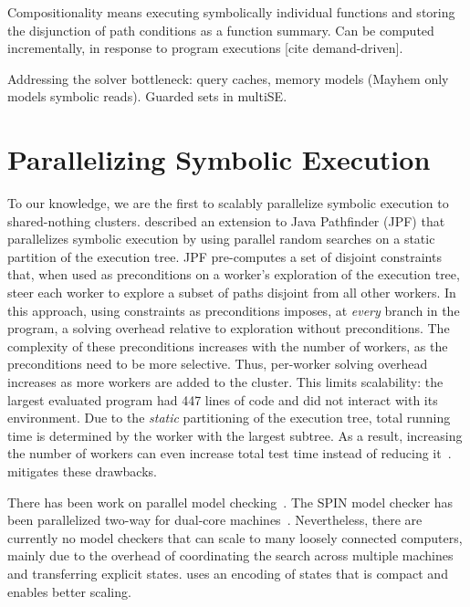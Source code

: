 Compositionality means executing symbolically individual functions and storing the disjunction of path conditions as a function summary.  Can be computed incrementally, in response to program executions [cite demand-driven].

Addressing the solver bottleneck: query caches, memory models (Mayhem only models symbolic reads). Guarded sets in multiSE.
\fi

\section{Parallelizing Symbolic Execution}
\label{sec:relwork:parsymbex}

To our knowledge, we are the first to scalably parallelize symbolic execution to shared-nothing clusters.
%
\cite{parallelSymbex} described an extension to Java Pathfinder (JPF) that parallelizes symbolic execution by using parallel random searches on a static partition of the execution tree.  JPF pre-computes a set of disjoint constraints that, when used as preconditions on a worker's exploration of the execution tree, steer each worker to explore a subset of paths disjoint from all other workers.  In this approach, using constraints as preconditions imposes, at {\em every} branch in the program, a solving overhead relative to exploration without preconditions.  The complexity of these preconditions increases with the number of workers, as the preconditions need to be more selective.  Thus, per-worker solving overhead increases as more workers are added to the cluster.  This limits scalability: the largest evaluated program had 447 lines of code and did not interact with its environment.  Due to the {\em static} partitioning of the execution tree, total running time is determined by the worker with the largest subtree.  As a result, increasing the number of workers can even increase total test time instead of reducing it~\cite{parallelSymbex}.  \cnine mitigates these drawbacks.

There has been work on parallel model checking~\cite{parallelMurphi,distributed-spin,loadBalModelchecking,spin:multicore-modelchecking,modelCheckBDD}.  The SPIN model checker has been parallelized two-way for dual-core machines~\cite{parallelSPIN}. Nevertheless, there are currently no model checkers that can scale to many loosely connected computers, mainly due to the overhead of coordinating the search across multiple machines and transferring explicit states. \cnine uses an encoding of states that is compact and enables better scaling.

